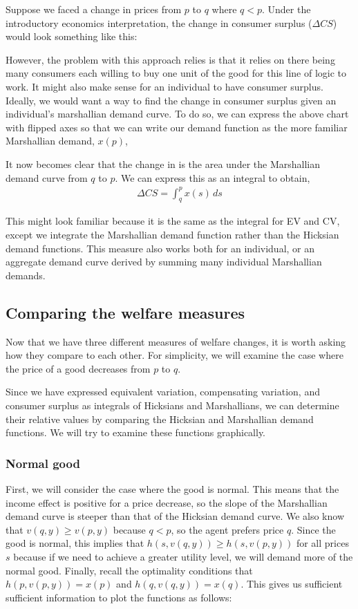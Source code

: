 Suppose we faced a change in prices from $p$ to $q$ where $q < p$. Under the introductory economics interpretation, the change in consumer surplus ($\Delta CS$) would look something like this: 

However, the problem with this approach relies is that it relies on there being many consumers each willing to buy one unit of the good for this line of logic to work. It might also make sense for an individual to have consumer surplus. Ideally, we would want a way to find the change in consumer surplus given an individual's marshallian demand curve. To do so, we can express the above chart with flipped axes so that we can write our demand function as the more familiar Marshallian demand, $x(p)$, 

It now becomes clear that the change in  is the area under the Marshallian demand curve from $q$ to $p$. We can express this as an integral to obtain,
\begin{align*}
    \Delta CS = \int_q^p x(s) \, ds
\end{align*}

This might look familiar because it is the same as the integral for EV and CV, except we integrate the Marshallian demand function rather than the Hicksian demand functions. This measure also works both for an individual, or an aggregate demand curve derived by summing many individual Marshallian demands. 

\subsection*{Comparing the welfare measures}
Now that we have three different measures of welfare changes, it is worth asking how they compare to each other. For simplicity, we will examine the case where the price of a good decreases from $p$ to $q$. 

Since we have expressed equivalent variation, compensating variation, and consumer surplus as integrals of Hicksians and Marshallians, we can determine their relative values by comparing the Hicksian and Marshallian demand functions. We will try to examine these functions graphically.

\subsubsection*{Normal good}
First, we will consider the case where the good is normal. This means that the income effect is positive for a price decrease, so the slope of the Marshallian demand curve is steeper than that of the Hicksian demand curve. We also know that $v(q, y) \geq v(p, y)$ because $q < p$, so the agent prefers price $q$. Since the good is normal, this implies that $h(s, v(q, y)) \geq h(s, v(p, y))$ for all prices $s$ because if we need to achieve a greater utility level, we will demand more of the normal good. Finally, recall the optimality conditions that $h(p, v(p, y)) = x(p)$ and $h(q, v(q, y)) = x(q)$. This gives us sufficient sufficient information to plot the functions as follows:

